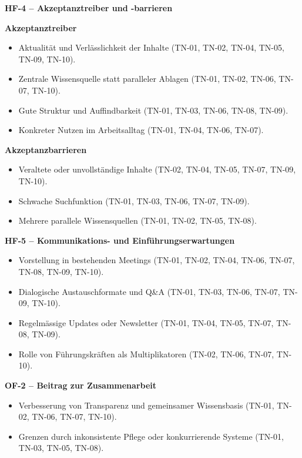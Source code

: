 \vspace{2em}
\textbf{HF-4 -- Akzeptanztreiber und -barrieren}

\textbf{Akzeptanztreiber}
\begin{itemize}
  \item Aktualität und Verlässlichkeit der Inhalte (TN-01, TN-02, TN-04, TN-05, TN-09, TN-10).
  \item Zentrale Wissensquelle statt paralleler Ablagen (TN-01, TN-02, TN-06, TN-07, TN-10).
  \item Gute Struktur und Auffindbarkeit (TN-01, TN-03, TN-06, TN-08, TN-09).
  \item Konkreter Nutzen im Arbeitsalltag (TN-01, TN-04, TN-06, TN-07).
\end{itemize}

\textbf{Akzeptanzbarrieren}
\begin{itemize}
  \item Veraltete oder unvollständige Inhalte (TN-02, TN-04, TN-05, TN-07, TN-09, TN-10).
  \item Schwache Suchfunktion (TN-01, TN-03, TN-06, TN-07, TN-09).
  \item Mehrere parallele Wissensquellen (TN-01, TN-02, TN-05, TN-08).
\end{itemize}

\vspace{2em}
\textbf{HF-5 -- Kommunikations- und Einführungserwartungen}

\begin{itemize}
  \item Vorstellung in bestehenden Meetings (TN-01, TN-02, TN-04, TN-06, TN-07, TN-08, TN-09, TN-10).
  \item Dialogische Austauschformate und Q\&A (TN-01, TN-03, TN-06, TN-07, TN-09, TN-10).
  \item Regelmässige Updates oder Newsletter (TN-01, TN-04, TN-05, TN-07, TN-08, TN-09).
  \item Rolle von Führungskräften als Multiplikatoren (TN-02, TN-06, TN-07, TN-10).
\end{itemize}

\vspace{2em}
\textbf{OF-2 -- Beitrag zur Zusammenarbeit}

\begin{itemize}
  \item Verbesserung von Transparenz und gemeinsamer Wissensbasis (TN-01, TN-02, TN-06, TN-07, TN-10).
  \item Grenzen durch inkonsistente Pflege oder konkurrierende Systeme (TN-01, TN-03, TN-05, TN-08).
\end{itemize}

